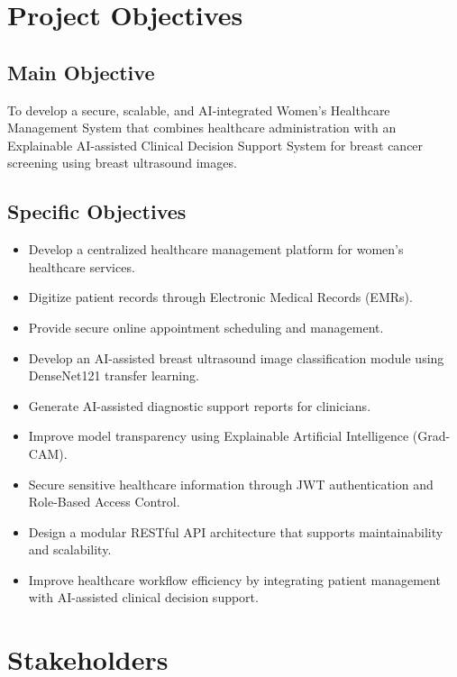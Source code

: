 \documentclass[12pt,a4paper]{report}
\begin{document}
\section{Project Objectives}

\subsection*{Main Objective}
To develop a secure, scalable, and AI-integrated Women's Healthcare Management System that combines healthcare administration with an Explainable AI-assisted Clinical Decision Support System for breast cancer screening using breast ultrasound images.

\subsection*{Specific Objectives}
\begin{itemize}[noitemsep]
    \item Develop a centralized healthcare management platform for women's healthcare services.
    \item Digitize patient records through Electronic Medical Records (EMRs).
    \item Provide secure online appointment scheduling and management.
    \item Develop an AI-assisted breast ultrasound image classification module using DenseNet121 transfer learning.
    \item Generate AI-assisted diagnostic support reports for clinicians.
    \item Improve model transparency using Explainable Artificial Intelligence (Grad-CAM).
    \item Secure sensitive healthcare information through JWT authentication and Role-Based Access Control.
    \item Design a modular RESTful API architecture that supports maintainability and scalability.
    \item Improve healthcare workflow efficiency by integrating patient management with AI-assisted clinical decision support.
\end{itemize}

\section{Stakeholders}
\end{document}
